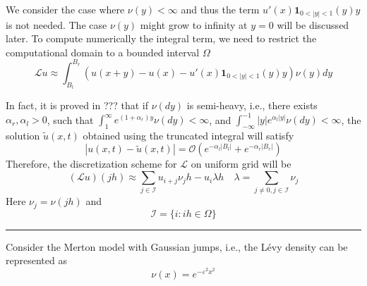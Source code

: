 \documentclass[10pt,a4paper]{article}
\theoremstyle{definition}
\begin{document}
We consider the case where $\nu(y)<\infty$ and thus the term $u'(x)\mathbf{1}_{0<|y|<1}(y)y$ is not needed. The case $\nu(y)$ might grow to infinity at $y=0$ will be discussed later. To compute numerically the integral term, we need to restrict the computational domain to a bounded interval $\Omega$
\begin{equation}
	\mathcal{L}u \approx \int_{B_l}^{B_r} (u(x+y)-u(x)-u'(x)\mathbf{1}_{0<|y|<1}(y)y)\nu(y)dy
\end{equation}

In fact, it is proved in ??? that if $\nu(dy)$ is semi-heavy, i.e., there exists $\alpha_r,\alpha_l>0$, such that $\int_1^\infty e^{(1+\alpha_r)y}\nu(dy)<\infty$, and $\int_{-\infty}^{-1}|y|e^{\alpha_l|y|}\nu(dy)<\infty$, the solution $\tilde u(x,t)$ obtained using the truncated integral will satisfy
\begin{equation}
	|u( x,t)-\tilde u(x,t)| =\mathcal{O}(e^{-\alpha_l|B_l|}+e^{-\alpha_r|B_r|})
\end{equation}
Therefore, the discretization scheme for $\mathcal{L}$ on uniform grid will be
\begin{equation}
	(\mathcal{L} u)(jh) \approx   \sum_{j\in \mathcal{I}} u_{i+j}\nu_j h - u_i \lambda h\quad \lambda = \sum_{j\neq 0, j\in \mathcal{I}} \nu_j
\end{equation}
Here $\nu_j=\nu(jh)$ and 
\begin{equation}
	\mathcal{I} = \{i: ih\in \Omega\}
\end{equation}

 
 \hrule
 
Consider the Merton model with Gaussian jumps, i.e., the L\'evy density can be represented as
\begin{equation}
	\nu(x) = e^{-\varepsilon^2 x^2}
\end{equation}
\end{document}
